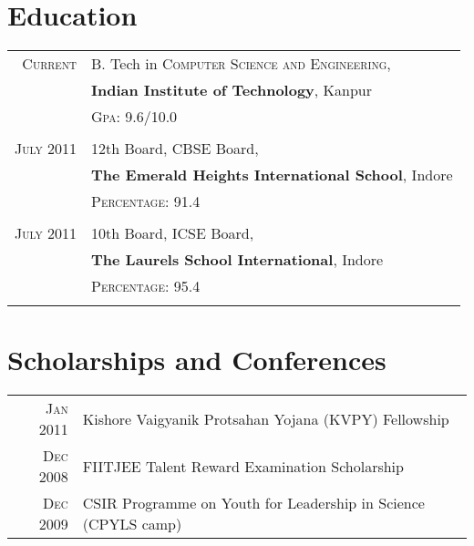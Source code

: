 \documentclass[a4paper,10pt]{article} %
\begin{document}
\section{Education}

\begin{tabular}{rl}

    \textsc{Current} & B. Tech in \textsc{Computer Science and Engineering},\\
                     & \textbf{Indian Institute of Technology}, Kanpur\\
                     & \normalsize \textsc{Gpa}: 9.6/10.0 \\
                     \\

    \textsc{July} 2011 & 12th Board, \textsc{CBSE} Board, \\
                       & \normalsize\textbf{The Emerald Heights International School}, Indore\\
                       & \normalsize \textsc{Percentage}: 91.4 \\
                       \\

    \textsc{July} 2011 & 10th Board, \textsc{ICSE} Board,  \\
                       & \normalsize\textbf{The Laurels School International}, Indore \\
                       & \normalsize \textsc{Percentage}: 95.4 \\
                       \\

\end{tabular}

\section{Scholarships and Conferences}

\begin{tabular}{rl}

    \textsc{Jan} 2011 & Kishore Vaigyanik Protsahan Yojana (KVPY) Fellowship \\
    \textsc{Dec} 2008 & FIITJEE Talent Reward Examination Scholarship \\
    \textsc{Dec} 2009 & CSIR Programme on Youth for Leadership in Science (CPYLS camp) \\

\end{tabular}
\end{document}
